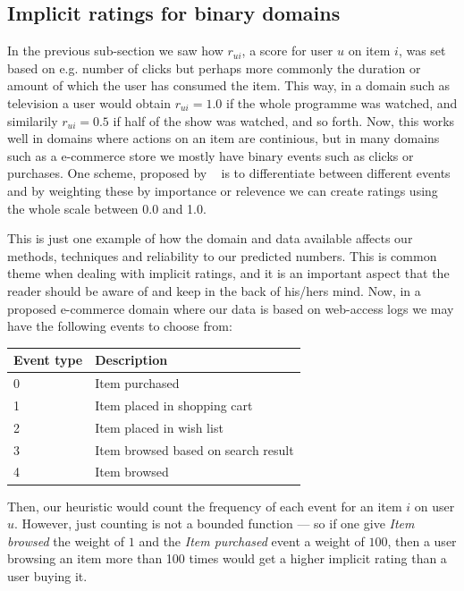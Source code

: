 \subsection{Implicit ratings for binary domains}
\label{implicit-binary-domains}

In the previous sub-section we saw how $r_{ui}$, a score for user $u$ on item
$i$, was set based on e.g. number of clicks but perhaps more commonly the
duration or amount of which the user has consumed the item. This way, in a
domain such as television a user would obtain $r_{ui} = 1.0$ if the whole
programme was watched, and similarily $r_{ui} = 0.5$ if half of the show was
watched, and so forth. Now, this works well in domains where actions on an item
are continious, but in many domains such as a e-commerce store we mostly have
binary events such as clicks or purchases. One scheme, proposed by
~\cite{pkghost2014implicit} is to differentiate between different events and by
weighting these by importance or relevence we can create ratings using the
whole scale between 0.0 and 1.0.

This is just one example of how the domain and data available affects our
methods, techniques and reliability to our predicted numbers. This is common
theme when dealing with implicit ratings, and it is an important aspect that
the reader should be aware of and keep in the back of his/hers mind. Now, in a
proposed e-commerce domain where our data is based on web-access logs we may
have the following events to choose from:

\begin{table}[H]
  \centering
  \begin{tabular}{ll}
  \toprule
  Event type & Description \\ \midrule
  0 & Item purchased \\
  1 & Item placed in shopping cart \\
  2 & Item placed in wish list \\
  3 & Item browsed based on search result \\
  4 & Item browsed \\
  \bottomrule
  \end{tabular}
\end{table}

Then, our heuristic would count the frequency of each event for an item $i$ on
user $u$. However, just counting is not a bounded function --- so if one give
\textit{Item browsed} the weight of $1$ and the \textit{Item purchased} event
a weight of $100$, then a user browsing an item more than 100 times would get a
higher implicit rating than a user buying it.

